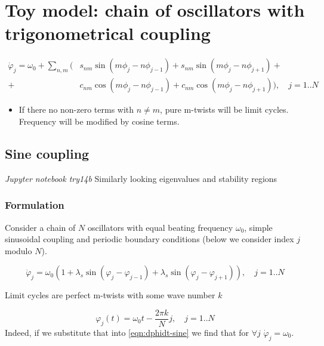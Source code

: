 \documentclass[a4paper,12pt]{article}
\begin{document}
\clearpage
\section{Toy model: chain of oscillators with trigonometrical coupling}
\newcommand*{\fr}[2]{\frac{2 \pi #1} {N} #2 } %
\newcommand*{\si}[2]{\sin  \fr{#1}{#2} } %
\newcommand*{\co}[2]{\cos \fr{#1}{#2} } 
\newcommand*{\ex}[2]{e ^{i \fr{#1}{#2}}}



\begin{align*}
\dot \varphi_j = \omega_0 + \sum_{n,m} ( & s_{nm}\sin(m\phi_j - n \phi_{j-1}) + s_{nm}\sin(m\phi_j - n \phi_{j+1}) +\\
+ & c_{nm} \cos(m\phi_j - n \phi_{j-1}) + c_{nm} \cos(m\phi_j - n \phi_{j+1}) ), \quad j=1..N
\end{align*}

\begin{itemize}
\item If there no non-zero terms with $n \neq m$, pure m-twists will be limit cycles. Frequency will be modified by cosine terms.
\end{itemize}



\subsection{Sine coupling }
\textit{Jupyter notebook try14b
}
Similarly looking eigenvalues and stability regions \cite{zou2009}
\subsubsection{Formulation}

Consider a chain of $N$ oscillators with equal beating frequency $\omega_0$, simple sinusoidal coupling and periodic boundary conditions (below we consider index $j$ modulo $N$).

\begin{equation}
\dot \varphi_j = \omega_0 (
1 + \lambda_s \sin(\varphi_j - \varphi_{j-1})
+ \lambda_s \sin(\varphi_j - \varphi_{j+1})), \quad j=1..N
\label{eqn:dphidt-sine}
\end{equation}

Limit cycles are perfect m-twists with some wave number $k$

$$
\varphi_j(t) = \omega_0 t - \fr{k}{j}, \quad j=1..N
$$
Indeed, if we substitute that into \eqref{eqn:dphidt-sine} we find that for  $\forall j$ $\dot \varphi_j = \omega_0$.
\end{document}
